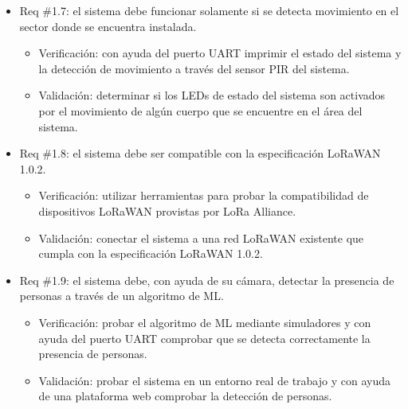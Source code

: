 \documentclass[
11pt, %
]{plan}
\begin{document}
\begin{enumerate}
\begin{itemize}
		\end{itemize}
		
		\begin{itemize}
			\item Req \#1.7: el sistema debe funcionar solamente si se detecta movimiento en el sector donde se encuentra instalada.

			\begin{itemize}
				\item Verificación: con ayuda del puerto UART imprimir el estado del sistema y la detección de movimiento a través del sensor PIR del sistema.
				\item Validación: determinar si los LEDs de estado del sistema son activados por el movimiento de algún cuerpo que se encuentre en el área del sistema.
			\end{itemize}

		\end{itemize}
		
		\begin{itemize}
			\item Req \#1.8: el sistema debe ser compatible con la especificación LoRaWAN 1.0.2.

			\begin{itemize}
				\item Verificación: utilizar herramientas para probar la compatibilidad de dispositivos LoRaWAN provistas por LoRa Alliance.
				\item Validación: conectar el sistema a una red LoRaWAN existente que cumpla con la especificación LoRaWAN 1.0.2.
			\end{itemize}

		\end{itemize}
		
		\begin{itemize}
			\item Req \#1.9: el sistema debe, con ayuda de su cámara, detectar la presencia de personas a través de un algoritmo de ML.

			\begin{itemize}
				\item Verificación: probar el algoritmo de ML mediante simuladores y con ayuda del puerto UART comprobar que se detecta correctamente la presencia de personas.
				\item Validación: probar el sistema en un entorno real de trabajo y con ayuda de una plataforma web comprobar la detección de personas.
			\end{itemize}


\end{itemize}
\end{enumerate}
\end{document}
